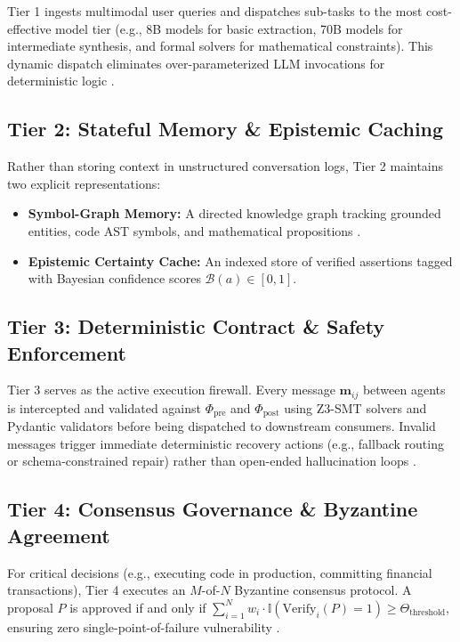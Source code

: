 \documentclass[10pt,journal,compsoc,twocolumn]{IEEEtran}
\begin{document}
Tier 1 ingests multimodal user queries and dispatches sub-tasks to the most cost-effective model tier (e.g., 8B models for basic extraction, 70B models for intermediate synthesis, and formal solvers for mathematical constraints). This dynamic dispatch eliminates over-parameterized LLM invocations for deterministic logic \cite{arxiv_2005_14165,arxiv_2305_18290}.


\subsection{Tier 2: Stateful Memory \& Epistemic Caching}

Rather than storing context in unstructured conversation logs, Tier 2 maintains two explicit representations:
\begin{itemize}
  \item \textbf{Symbol-Graph Memory:} A directed knowledge graph tracking grounded entities, code AST symbols, and mathematical propositions \cite{crossref_10_1145_3689096_3689462}.
  \item \textbf{Epistemic Certainty Cache:} An indexed store of verified assertions tagged with Bayesian confidence scores $\mathcal{B}(a) \in [0, 1]$.
\end{itemize}


\subsection{Tier 3: Deterministic Contract \& Safety Enforcement}

Tier 3 serves as the active execution firewall. Every message $\mathbf{m}_{ij}$ between agents is intercepted and validated against $\Phi_{\text{pre}}$ and $\Phi_{\text{post}}$ using Z3-SMT solvers and Pydantic validators before being dispatched to downstream consumers. Invalid messages trigger immediate deterministic recovery actions (e.g., fallback routing or schema-constrained repair) rather than open-ended hallucination loops \cite{arxiv_2404_01131}.


\subsection{Tier 4: Consensus Governance \& Byzantine Agreement}

For critical decisions (e.g., executing code in production, committing financial transactions), Tier 4 executes an $M$-of-$N$ Byzantine consensus protocol. A proposal $P$ is approved if and only if $\sum_{i=1}^N w_i \cdot \mathbb{I}(\text{Verify}_i(P) = 1) \ge \Theta_{\text{threshold}}$, ensuring zero single-point-of-failure vulnerability \cite{crossref_10_1109_access_2026_3656309}.
\end{document}

